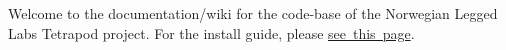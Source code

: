 \label{index_md_docs_markdown_mainpage}%
%
 Welcome to the documentation/wiki for the code-\/base of the Norwegian Legged Lab\textquotesingle{}s Tetrapod project. For the install guide, please \mbox{\hyperlink{md_docs_markdown_install_guide}{see this page}}. 